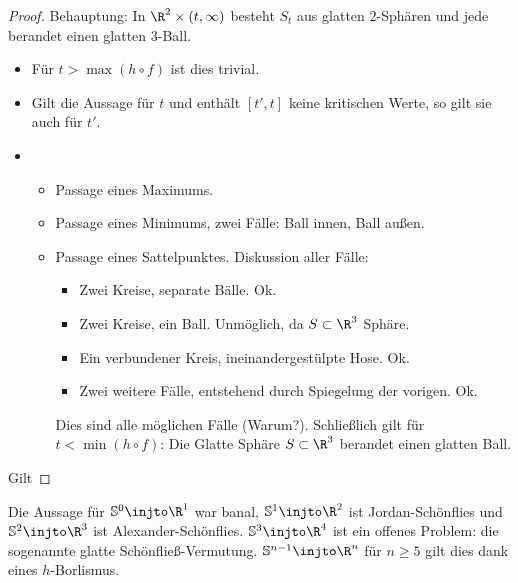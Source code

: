 \begin{st}
\begin{proof}
        Behauptung: In $\R^2 \times (t,\infty)$ besteht $S_t$ aus glatten $2$-Sphären und jede berandet einen glatten $3$-Ball.
        \begin{itemize}
            \item
                Für $t > \max(h\circ f)$ ist dies trivial.
            \item
                Gilt die Aussage für $t$ und enthält $[t', t]$ keine kritischen Werte, so gilt sie auch für $t'$.
            \item
                \begin{itemize}
                    \item
                        Passage eines Maximums.
                    \item
                        Passage eines Minimums, zwei Fälle: Ball innen, Ball außen.
                    \item
                        Passage eines Sattelpunktes.
                        Diskussion aller Fälle:
                        \begin{itemize}
                            \item
                                Zwei Kreise, separate Bälle. Ok.
                            \item
                                Zwei Kreise, ein Ball. Unmöglich, da $S \subset \R^3$ Sphäre.
                            \item
                                Ein verbundener Kreis, ineinandergestülpte Hose. Ok.
                            \item
                                Zwei weitere Fälle, entstehend durch Spiegelung der vorigen. Ok.
                        \end{itemize}
                        Dies sind alle möglichen Fälle (Warum?).
                        Schließlich gilt für $t < \min(h\circ f)$: Die Glatte Sphäre $S \subset \R^3$ berandet einen glatten Ball.
                \end{itemize}
        \end{itemize}
        Gilt
    \end{proof}
\end{st}

Die Aussage für $\S^0 \injto \R^1$ war banal, $\S^1 \injto \R^2$ ist Jordan-Schönflies und $\S^2 \injto \R^3$ ist Alexander-Schönflies.
$\S^3 \injto \R^4$ ist ein offenes Problem: die sogenannte glatte Schönfließ-Vermutung.
$\S^{n-1} \injto \R^n$ für $n \ge 5$ gilt dies dank eines $h$-Borlismus.


